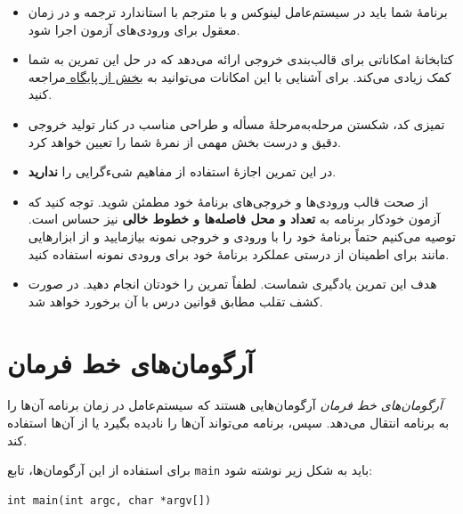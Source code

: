 \documentclass{utap}
\begin{document}
    \begin{itemize}
        \item برنامهٔ شما باید در سیستم‌عامل لینوکس و با مترجم  با استاندارد  ترجمه و در زمان معقول برای ورودی‌های آزمون اجرا شود.
        \item کتابخانهٔ  امکاناتی برای قالب‌بندی خروجی ارائه می‌دهد که در حل این تمرین به شما کمک زیادی می‌کند. برای آشنایی با این امکانات می‌توانید به \href{https://www.learncpp.com/cpp-tutorial/183-output-with-ostream-and-ios/}{بخش  از پایگاه } مراجعه کنید.
        \item تمیزی کد، شکستن مرحله‌به‌مرحلهٔ مسأله و طراحی مناسب در کنار تولید خروجی دقیق و درست بخش مهمی از نمرهٔ شما را تعیین خواهد کرد.
        \item در این تمرین اجازهٔ استفاده از مفاهیم شیءگرایی را \textbf{ندارید}.
        \item از صحت قالب ورودی‌ها و خروجی‌های برنامهٔ خود مطمئن شوید. توجه کنید که آزمون خودکار برنامه به \textbf{تعداد و محل فاصله‌ها و خطوط خالی} نیز حساس است. توصیه می‌کنیم حتماً برنامهٔ خود را با ورودی و خروجی نمونه بیازمایید و از ابزارهایی مانند  برای اطمینان از درستی عملکرد برنامهٔ خود برای ورودی نمونه استفاده کنید.
        \item هدف این تمرین یادگیری شماست. لطفاً تمرین را خودتان انجام دهید. در صورت کشف تقلب مطابق قوانین درس با آن برخورد خواهد شد.
    \end{itemize}

    \appendix

    \section[آرگومان‌های خط فرمان]{آرگومان‌های خط فرمان\label{sec:commandline-args}}

    \textit{آرگومان‌های خط فرمان} آرگومان‌هایی هستند که سیستم‌عامل در زمان برنامه آن‌ها را به برنامه انتقال می‌دهد. سپس، برنامه می‌تواند آن‌ها را نادیده بگیرد یا از آن‌ها استفاده کند.

    برای استفاده از این آرگومان‌ها، تابع \lstinline{main} باید به شکل زیر نوشته شود:
    \begin{latin}\begin{lstlisting}[aboveskip=-3ex]
int main(int argc, char *argv[])
    \end{lstlisting}\end{latin}
\end{document}
